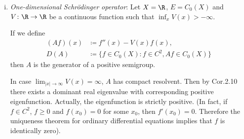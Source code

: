 \begin{example}\label{ex:b3-2.14}

\begin{enumerate}[(i), wide]
	
\item \emph{One-dimensional Schrödinger operator}:
	Let $X = \R$, $E = C_{0}(X)$ and $V \colon \R \to \R$ be a continuous function such that $\inf_{x} V(x) > -\infty$.
	
	If we define
	\begin{equation}\label{eq:b3-2.22}
		\begin{aligned}
			(Af)(x) &\coloneqq f''(x) - V(x)f(x), \\
			D(A) &\coloneqq \{f \in C_{0}(X) \colon f \in C^{2}, Af \in C_{0}(X)\}
		\end{aligned}
	\end{equation}
	then $A$ is the generator of a positive semigroup.
	
	In case $\lim_{|x| \to \infty}V(x) = \infty$, $A$ has compact resolvent.
	Then by Cor.2.10 there exists a dominant real eigenvalue with corresponding positive eigenfunction.
	Actually, the eigenfunction is strictly positive. (In fact, if $f \in C^{2}$, $f \geq 0$ and $f(x_{0}) = 0$ for some $x_{0}$, then $f'(x_{0}) = 0$.
	Therefore the uniqueness theorem for ordinary differential equations implies that $f$ is identically zero).
	

\end{enumerate}
\end{example}
